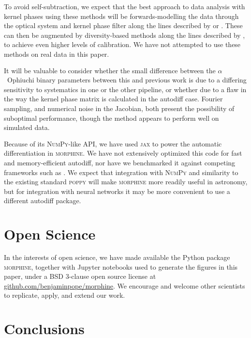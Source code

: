 \documentclass[modern]{aastex63}
\begin{document}
To avoid self-subtraction, we expect that the best approach to data analysis with kernel phases using these methods will be forwards-modelling the data through the optical system and kernel phase filter along the lines described by \citet{pueyo16} or \citet{martinache20}. These can then be augmented by diversity-based methods along the lines described by \citet{ireland13}, to achieve even higher levels of calibration. We have not attempted to use these methods on real data in this paper.

It will be valuable to consider whether the small difference between the $\alpha$~Ophiuchi binary parameters between this and previous work is due to a differing sensitivity to systematics in one or the other pipeline, or whether due to a flaw in the way the kernel phase matrix is calculated in the autodiff case. Fourier sampling, and numerical noise in the Jacobian, both present the possibility of suboptimal performance, though the method appears to perform well on simulated data.

Because of its \textsc{NumPy}-like API, we have used \textsc{jax} to power the automatic differentiation in \textsc{morphine}. We have not extensively optimized this code for fast and memory-efficient autodiff, nor have we benchmarked it against competing frameworks such as . We expect that integration with \textsc{NumPy} and similarity to the existing standard \textsc{poppy} will make \textsc{morphine} more readily useful in astronomy, but for integration with neural networks it may be more convenient to use a different autodiff package. 

\section{Open Science}
\label{sec:open}

In the interests of open science, we have made available the Python package \textsc{morphine}, together with Jupyter notebooks used to generate the figures in this paper, under a BSD 3-clause open source license at \href{https://github.com/benjaminpope/morphine}{github.com/benjaminpope/morphine}. We encourage and welcome other scientists to replicate, apply, and extend our work.

\section{Conclusions}
\label{sec:conclusions}
\end{document}
